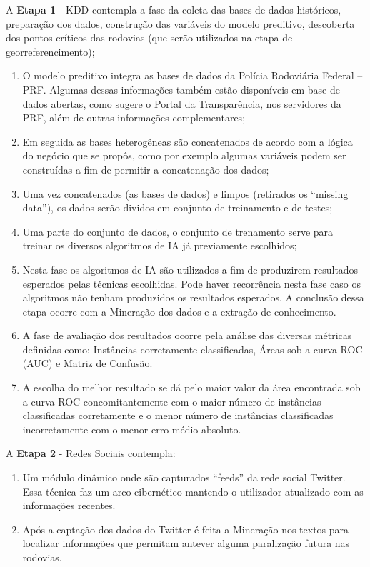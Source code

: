 A \textbf{Etapa 1} - KDD contempla a fase da coleta das bases de dados históricos, preparação dos dados, construção das variáveis do modelo preditivo, descoberta dos pontos críticos das rodovias (que serão utilizados na etapa de georreferencimento);
  \begin{enumerate}
    \item O modelo preditivo integra as bases de dados da Polícia Rodoviária Federal -- PRF.
     Algumas dessas informações também estão disponíveis em base de dados abertas, como sugere o Portal da Transparência, nos servidores da PRF, além de outras informações complementares;
    
    \item Em seguida as bases heterogêneas são concatenados de acordo com a lógica do negócio que se propôs, como por exemplo algumas variáveis podem ser construídas a fim de permitir a concatenação dos dados;
    
    \item Uma vez concatenados (as bases de dados) e limpos (retirados os ``missing data''), os dados serão dividos em conjunto de treinamento e de testes;
   
    \item Uma parte do conjunto de dados, o conjunto de trenamento serve para treinar os diversos algoritmos de IA já previamente escolhidos;
    
    \item Nesta fase os algoritmos de IA são utilizados a fim de produzirem resultados esperados pelas técnicas escolhidas. Pode haver recorrência nesta fase caso os algoritmos não tenham produzidos os resultados esperados. A conclusão dessa etapa ocorre com a Mineração dos dados e a extração de conhecimento.
    
    \item A fase de avaliação dos resultados ocorre pela análise das diversas métricas definidas como: Instâncias corretamente classificadas, Áreas sob a curva ROC (AUC) e Matriz de Confusão.
     
	\item A escolha do melhor resultado se dá pelo maior valor da área encontrada sob a curva ROC concomitantemente com o maior número de instâncias classificadas corretamente e o menor número de instâncias classificadas incorretamente com o menor erro médio absoluto. 
\end{enumerate}
  
  
A \textbf{Etapa 2} - Redes Sociais contempla:
 \begin{enumerate}
 	\item Um módulo dinâmico onde são capturados ``feeds'' da rede social Twitter. 
 	     Essa técnica faz um arco cibernético mantendo o utilizador atualizado com as informações recentes.

 	\item Após a captação dos dados do Twitter é feita a Mineração nos textos para localizar informações que permitam antever alguma paralização futura nas rodovias. 
  \end{enumerate}

